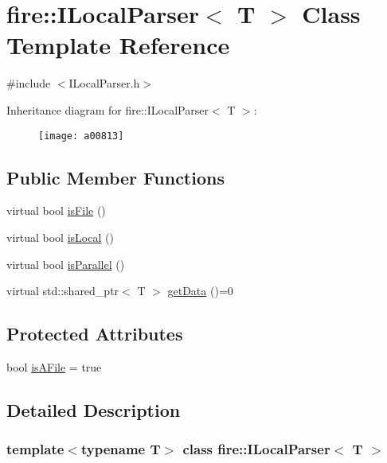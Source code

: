 \hypertarget{a00813}{}\section{fire\+:\+:I\+Local\+Parser$<$ T $>$ Class Template Reference}
\label{a00813}


{\ttfamily \#include $<$I\+Local\+Parser.\+h$>$}

Inheritance diagram for fire\+:\+:I\+Local\+Parser$<$ T $>$\+:\begin{figure}[H]
\begin{center}
\leavevmode
\texttt{[image: a00813]}
\end{center}
\end{figure}
\subsection*{Public Member Functions}
\begin{DoxyCompactItemize}
\item 
virtual bool \hyperlink{a00813_a091d5cf56bf8f407854ef87f460b2958}{is\+File} ()
\item 
virtual bool \hyperlink{a00813_a770acae6e216de3a9c7140a12de25d58}{is\+Local} ()
\item 
virtual bool \hyperlink{a00813_ad46898c516adcce38acbb4800dc9777b}{is\+Parallel} ()
\item 
virtual std\+::shared\+\_\+ptr$<$ T $>$ \hyperlink{a00813_a0fc1446d106f0ab8daf8744a4bd29a65}{get\+Data} ()=0
\end{DoxyCompactItemize}
\subsection*{Protected Attributes}
\begin{DoxyCompactItemize}
\item 
bool \hyperlink{a00813_a39adf288ae0bc79cf39fd6e4638858cf}{is\+A\+File} = true
\end{DoxyCompactItemize}


\subsection{Detailed Description}
\subsubsection*{template$<$typename T$>$\newline
class fire\+::\+I\+Local\+Parser$<$ T $>$}

